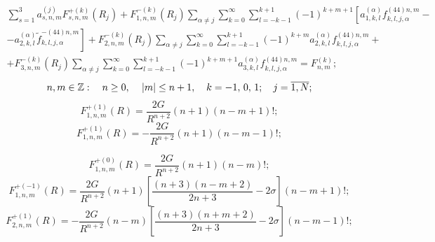\begin{multline}
\sum\limits_{s = 1}^3 {a_{s,n,m}^{(j)}} F_{s,n,m}^{ + (k)}({R_j}) + F_{1,n,m}^{ - (k)}({R_j})\sum\limits_{\alpha  \ne j} {\sum\limits_{k = 0}^\infty  {\sum\limits_{l =  - k - 1}^{k + 1} {{{( - 1)}^{k + m + 1}}} } \left[ {a_{1,k,l}^{(\alpha )}f_{k,l,j,\alpha }^{(44)n,m} - } \right.} \\
\left. { - a_{2,k,l}^{(\alpha )}\tilde f_{k,l,j,\alpha }^{ - (44)n,m}} \right] + F_{2,n,m}^{ - (k)}({R_j})\sum\limits_{\alpha  \ne j} {\sum\limits_{k = 0}^\infty  {\sum\limits_{l =  - k - 1}^{k + 1} {{{( - 1)}^{k + m}}} } a_{2,k,l}^{(\alpha )}f_{k,l,j,\alpha }^{(44)n,m} + } \\
+ F_{3,n,m}^{ - (k)}({R_j})\sum\limits_{\alpha  \ne j} \sum\limits_{k = 0}^\infty  {\sum\limits_{l =  - k - 1}^{k + 1} {{{( - 1)}^{k + m + 1}}} } a_{3,k,l}^{(\alpha )}f_{k,l,j,\alpha }^{(44)n,m} = F_{n,m}^{(k)};
\label{eq:8:sys}
\end{multline}
$$
n,m \in\mathbb{Z}:\quad n \ge 0,{\mkern 1mu} \quad {\kern 1pt} |m| \le n + 1,\quad {\mkern 1mu} k =  - 1,{\mkern 1mu} {\kern 1pt} 0,{\mkern 1mu} {\kern 1pt} 1;\;\;\;{\mkern 1mu} {\kern 1pt} j = \overline {1,N};
$$
\begin{equation}
F_{1,n,m}^{ + (1)}(R) = \frac{{2G}}{{{R^{n + 2}}}}(n + 1)(n - m + 1)!;
\label{eq:8:12}
\end{equation}
\begin{equation}
F_{1,n,m}^{ + (1)}(R) =  - \frac{{2G}}{{{R^{n + 2}}}}(n + 1)(n - m - 1)!;
\label{eq:8:12a}
\end{equation}

\begin{equation}
F_{1,n,m}^{ + (0)}(R) = \frac{{2G}}{{{R^{n + 2}}}}(n + 1)(n - m)!;
\label{eq:8:13a}
\end{equation}
\begin{equation}
F_{1,n,m}^{ + ( - 1)}(R) = \frac{{2G}}{{{R^{n + 2}}}}(n + 1)\left[ {\frac{{(n + 3)(n - m + 2)}}{{2n + 3}} - 2\sigma } \right](n - m + 1)!;
\label{eq:8:13b}
\end{equation}
\begin{equation}
F_{2,n,m}^{ + (1)}(R) = - \frac{{2G}}{{{R^{n + 2}}}}(n - m)\left[ {\frac{{(n + 3)(n + m + 2)}}{{2n + 3}} - 2\sigma } \right](n - m - 1)!;
\label{eq:8:13c}
\end{equation}

